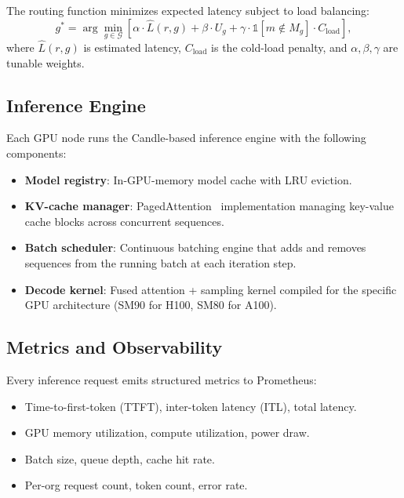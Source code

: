 The routing function minimizes expected latency subject to load balancing:
\begin{equation}
g^* = \arg\min_{g \in \mathcal{G}} \left[ \alpha \cdot \hat{L}(r, g) +
\beta \cdot U_g + \gamma \cdot \mathbb{1}[m \notin M_g] \cdot C_{\text{load}} \right],
\label{eq:routing}
\end{equation}
where $\hat{L}(r, g)$ is estimated latency, $C_{\text{load}}$ is the cold-load
penalty, and $\alpha, \beta, \gamma$ are tunable weights.

\subsection{Inference Engine}

Each GPU node runs the Candle-based inference engine with the following
components:
\begin{itemize}[leftmargin=1.1em]
    \item \textbf{Model registry}: In-GPU-memory model cache with LRU eviction.
    \item \textbf{KV-cache manager}: PagedAttention~\cite{vllm2023} implementation
    managing key-value cache blocks across concurrent sequences.
    \item \textbf{Batch scheduler}: Continuous batching engine that adds and
    removes sequences from the running batch at each iteration step.
    \item \textbf{Decode kernel}: Fused attention + sampling kernel compiled
    for the specific GPU architecture (SM90 for H100, SM80 for A100).
\end{itemize}

\subsection{Metrics and Observability}

Every inference request emits structured metrics to Prometheus:
\begin{itemize}[leftmargin=1.1em]
    \item Time-to-first-token (TTFT), inter-token latency (ITL), total latency.
    \item GPU memory utilization, compute utilization, power draw.
    \item Batch size, queue depth, cache hit rate.
    \item Per-org request count, token count, error rate.
\end{itemize}

